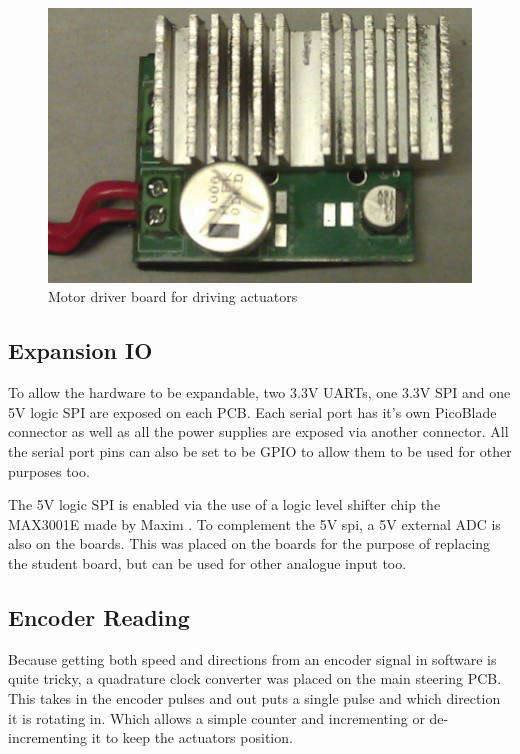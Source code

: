    \begin{figure}[h]
     \centering
     \includegraphics[width=.9\linewidth]{Images/motorPCB.png}
     \caption{Motor driver board for driving actuators}
     \label{motorPCB}
   \end{figure}


  \subsection{Expansion IO}
  To allow the hardware to be expandable, two 3.3V UARTs, one 3.3V SPI and
  one 5V logic SPI are exposed on each PCB. Each serial port has it's own
  PicoBlade connector\cite{PicoBlade} as well as all the power supplies are
  exposed via another connector. All the serial port pins can also be set to be
  GPIO to allow them to be used for other purposes too.

  The 5V logic SPI is enabled via the use of a logic level shifter chip
  the MAX3001E made by Maxim \cite{MAX3001E}. To complement the 5V spi, a 5V
  external ADC is also on the boards. This was placed on the boards for the
  purpose of replacing the student board, but can be used for other analogue
  input too.

  \subsection{Encoder Reading}
  Because getting both speed and directions from an encoder signal in software
  is quite tricky, a quadrature clock converter was placed on the main steering
  PCB.  This takes in the encoder pulses and out puts a single pulse and which
  direction it is rotating in. Which allows a simple counter and incrementing or
  de-incrementing it to keep the actuators position.

